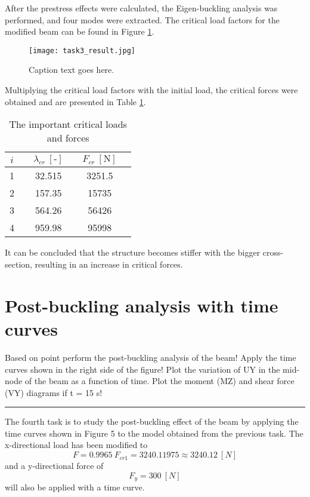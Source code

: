 \documentclass[12pt]{article}
\newcommand*\circled[1]{%
  \tikz[baseline=(char.base)]{%
    \node[shape=circle,draw,inner sep=1pt] (char) {#1};%
  }%
}
\newcommand{\horrule}[1]{\rule{\linewidth}{#1}}
\begin{document}
\noindent After the prestress effects were calculated, the Eigen-buckling analysis was performed, and four modes were extracted. The critical load factors for the modified beam can be found in Figure \ref{fig:KEP3}.

\begin{figure}[h]
\centering
\texttt{[image: task3\_result.jpg]}
\caption{Caption text goes here.}
\label{fig:KEP3}
\end{figure}


\noindent Multiplying the critical load factors with the initial load, the critical forces were obtained and are presented in Table \ref{tab:critical-loads-forces3}. 

\begin{table}[h]
\centering
\captionsetup{justification=centering,position=top} %
\caption{The important critical loads and forces} %
\label{tab:critical-loads-forces3}
\begin{tabular}{cccccc}

$i$ && $\lambda_{cr} ~ \left[ \text{-} \right]$ && $F_{cr} ~ \left[ \text{N} \right]$ \\
\hline
1 && 32.515 &&  3251.5 \\
2 &&  157.35 &&  15735 \\
3 &&  564.26 &&  56426 \\
4 &&  959.98 &&  95998 \\

\end{tabular}
\end{table}

\noindent It can be concluded that the structure becomes stiffer with the bigger cross-section, resulting in an increase in critical forces.

\section{Post-buckling analysis with time curves}
Based on point \circled{3.} perform the post-buckling analysis of the beam! Apply the time curves shown
in the right side of the figure! Plot the variation of UY in the mid-node of the beam as a function
of time. Plot the moment (MZ) and shear force (VY) diagrams if t = 15 s!\\
\horrule{0.4pt}
\medskip

\noindent The fourth task is to study the post-buckling effect of the beam by applying the time curves shown in Figure 5 to the model obtained from the previous task. The x-directional load has been modified to 
\begin{equation}
F = 0.9965 ~ F_{cr1} = 3240.11975 \approx 3240.12 ~ [N]
\end{equation}
and a y-directional force of 
\begin{equation}
F_y = 300 ~ [N]
\end{equation}
will also be applied with a time curve.\\
\end{document}
